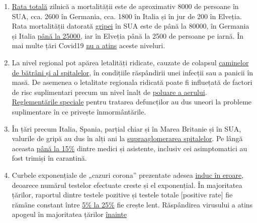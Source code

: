 \begin{enumerate}
{  falsă}.
\item
  \href{https://www.cdc.gov/mmwr/volumes/68/wr/mm6826a5.htm}{Rata
  totală} zilnică a mortalității este de aproximativ 8000 de persoane în
  SUA, cca. 2600 în Germania, cca. 1800 în Italia și în jur de 200 în
  Elveția. Rata mortalității datorată
  \href{https://www.statnews.com/2018/09/26/cdc-us-flu-deaths-winter/}{gripei}
  în SUA este de până la 80000, în Germania și Italia
  \href{https://www.sciencedirect.com/science/article/pii/S1201971219303285}{până
  la 25000}, iar în Elveția până la 2500 de persoane pe iarnă. În mai
  multe țări Covid19 \href{https://www.euromomo.eu/graphs-and-maps}{nu a
  atins} aceste niveluri.
\item
  La nivel regional pot apărea letalități ridicate, cauzate de colapsul
  \href{https://swprs.org/covid19-bericht-aus-italien/}{caminelor de
  bătrâni și al spitalelor}, în condițiile răspândirii unei infecții sau
  a panicii în masă. De asemenea o letalitate regionala ridicată poate
  fi influețată de factori de risc suplimentari precum un nivel înalt de
  \href{https://www.heise.de/tp/features/Feinstaubpartikel-als-Viren-Vehikel-4687454.html}{poluare
  a aerului}.
  \href{https://www.ecdc.europa.eu/sites/default/files/documents/COVID-19-safe-handling-of-bodies-or-persons-dying-from-COVID19.pdf}{Reglementările
  speciale} pentru tratarea defuncților au dus uneori la probleme
  suplimentare în ce privește înmormântările.
\item
  În țări precum Italia, Spania, parțial chiar și în Marea Britanie și
  în SUA, valurile de gripă au dus în alți ani la
  \href{https://off-guardian.org/2020/04/02/coronavirus-fact-check-1-flu-doesnt-overwhelm-our-hospitals/}{supraaglomerarea
  spitalelor}. Pe lângă aceasta
  \href{https://www.nytimes.com/2020/03/24/world/europe/coronavirus-europe-covid-19.html}{până
  la 15\%} dintre medici și asistente, inclusiv cei asimptomatici au
  fost trimiși în carantină.
\item
  Curbele exponențiale de „cazuri corona'' prezentate adesea
  \href{https://multipolar-magazin.de/artikel/coronavirus-irrefuhrung-fallzahlen}{induc
  în eroare}, deoarece numărul testelor efectuate creste și el
  exponențial. În majoritatea țărilor, raportul dintre testele pozitive
  și testele totale {[}positive rate{]} fie rămâne constant între
  \href{https://swprs.org/rate-of-positive-covid19-tests/}{5\% la 25\%}
  fie crește lent. Răspândirea virusului a atins apogeul în majoritatea
  țărilor
  \href{https://infekt.ch/2020/04/sind-wir-tatsaechlich-im-blindflug/}{înainte}

\end{enumerate}
